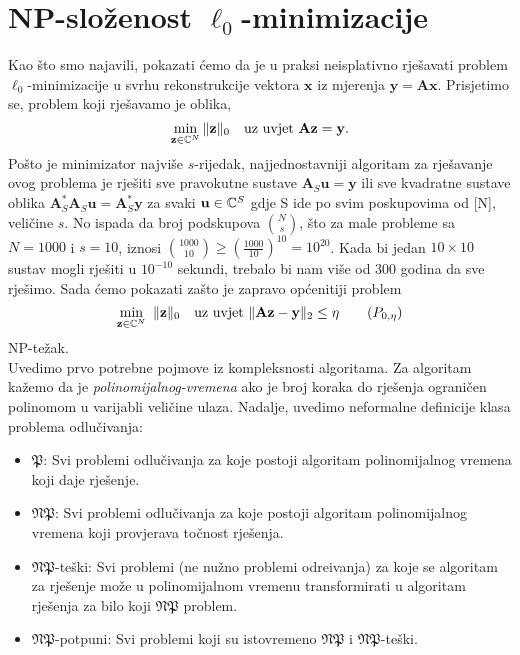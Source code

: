 \documentclass[a4paper,twoside,12pt]{memoir} %
\newcommand{\vect}[1]{\mathbf{#1}}
\renewcommand{\vec}{\vect}
\newcommand{\norm}[1]{\|{#1}\|}
\begin{document}
\section[NP-slo\v{z}enost $\mathbf{\ell_0}$-minimizacije][NP-slo\v{z}enost $\ell_0$-minimizacije]{NP-slo\v{z}enost $\ell_0$-minimizacije}
Kao \v{s}to smo najavili, pokazati \'cemo da je u praksi neisplativno rje\v{s}avati problem $\ell_0$-minimizacije u svrhu rekonstrukcije vektora $\vec x$ iz mjerenja $\vec y = \vec{Ax}$. Prisjetimo se, problem koji rje\v{s}avamo je oblika, 
\begin{equation*}
    \min_{\vec z \in \C^N} \norm{\vec z}_0 \quad \text{uz uvjet } \vec{Az}=\vec y. 
\end{equation*}
Po\v{s}to je minimizator najvi\v{s}e $s$-rijedak, najjednostavniji algoritam za rje\v{s}avanje ovog problema je rje\v{s}iti sve pravokutne sustave $\vec A_S \vec u = \vec y$ ili sve kvadratne sustave oblika $\vec A_S^* \vec A_S \vec u = \vec A_S^* \vec y$ za svaki $\vec u \in \C^S$ gdje S ide po svim poskupovima od [N], veli\v{c}ine $s$. No ispada da broj podskupova $N \choose s$, \v{s}to za male probleme sa $N = 1000$ i $s=10$, iznosi ${1000 \choose 10} \geq (\frac{1000}{10})^{10}=10^{20}$. Kada bi jedan $10 \times 10$ sustav mogli rje\v{s}iti u $10^{-10}$ sekundi, trebalo bi nam vi\v{s}e od 300 godina da sve rje\v{s}imo. Sada \'cemo pokazati za\v{s}to je zapravo op\'cenitiji problem
\begin{equation}
\min_{\vec z \in \C^N}\ \norm{\vec z}_0 \quad \text{uz uvjet }\norm{\vec{Az}- \vec{y}}_2 \leq \eta \tag{$P_{0, \eta}$}\label{problem_minimizacije_generalni}
\end{equation}
NP-te\v{z}ak.\\
\indent Uvedimo prvo potrebne pojmove iz kompleksnosti algoritama. Za algoritam ka\v{z}emo da je \textit{polinomijalnog-vremena} ako je broj koraka do rje\v{s}enja ograni\v{c}en polinomom u varijabli veli\v{c}ine ulaza. Nadalje, uvedimo neformalne definicije klasa problema odlu\v{c}ivanja:
\begin{itemize}
    \item $\mathfrak{P}$: Svi problemi odlu\v{c}ivanja za koje postoji algoritam polinomijalnog vremena koji daje rje\v{s}enje.
    \item $\mathfrak{NP}$: Svi problemi odlu\v{c}ivanja za koje postoji algoritam polinomijalnog vremena koji provjerava to\v{c}nost rje\v{s}enja.
    \item $\mathfrak{NP}$-te\v{s}ki: Svi problemi (ne nu\v{z}no problemi odre\dj ivanja) za koje se algoritam za rje\v{s}enje mo\v{z}e u polinomijalnom vremenu transformirati u algoritam rje\v{s}enja za bilo koji $\mathfrak{NP}$ problem.
    \item $\mathfrak{NP}$-potpuni: Svi problemi koji su istovremeno $\mathfrak{NP}$ i $\mathfrak{NP}$-te\v{s}ki.
\end{itemize}
\end{document}
